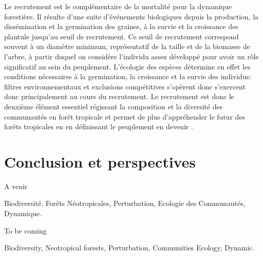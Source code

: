 \documentclass[
  11pt,
  french,
  A4paper,
  extrafontsizes,onecolumn,openright
  ]{memoir}
\begin{document}
Le recrutement est le complémentaire de la mortalité pour la dynamique
forestière. Il résulte d'une suite d'événements biologiques depuis la
production, la dissémination et la germination des graines, à la survie
et la croissance des plantule jusqu'au seuil de recrutement. Ce seuil de
recrutement correspond souvent à un diamètre minimum, représentatif de
la taille et de la biomasse de l'arbre, à partir duquel on considère
l'individu assez développé pour avoir un rôle significatif au sein du
peuplement. L'écologie des espèces détermine en effet les conditions
nécessaires à la germination, la croissance et la survie des individus:
filtres environnementaux et exclusions compétitives s'opèrent donc
s'exercent donc principalement au cours du recrutement. Le recrutement
est donc le deuxième élément essentiel régissant la composition et la
diversité des communautés en forêt tropicale et permet de plus
d'appréhender le futur des forêts tropicales en en définissant le
peuplement en devenir \autocite[ + cf biblio Elodie]{Denslow1980}.

\chapter{Conclusion et perspectives}\label{conclusion-et-perspectives}



\backmatter
\SmallMargins

%
\printbibliography










\evenpage
\SmallMargins
\thispagestyle{empty}

\begin{normalsize}

\begin{description}

\item[Résumé:]
A venir

\item[Mots clés :]
Biodiversité, Forêts Néotropicales, Perturbation, Ecologie des Communautés, Dynamique.
~\\

\item[Abstract:]
To be coming

\item[Keywords:]
Biodiversity, Neotropical forests, Perturbation, Communities Ecology, Dynamic.

\end{description}

\end{normalsize}
\end{document}
